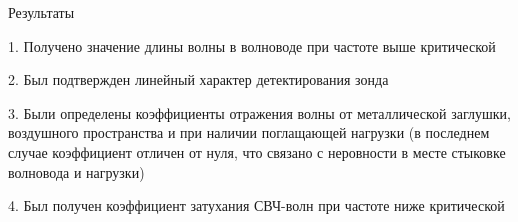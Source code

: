 \documentclass[12pt]{beamer}
\begin{document}
\begin{frame}{Результаты}

    \begin{block}{}
        \item 1. Получено значение длины волны в волноводе при частоте выше критической
        \item 2. Был подтвержден линейный характер детектирования зонда
        \item 3. Были определены коэффициенты отражения волны от металлической заглушки, воздушного пространства и при наличии поглащающей нагрузки (в последнем случае коэффициент отличен от нуля, что связано с неровности в месте стыковке волновода и нагрузки)
        \item 4. Был получен коэффициент затухания СВЧ-волн при частоте ниже критической
    \end{block}
    
\end{frame}
\end{document}

